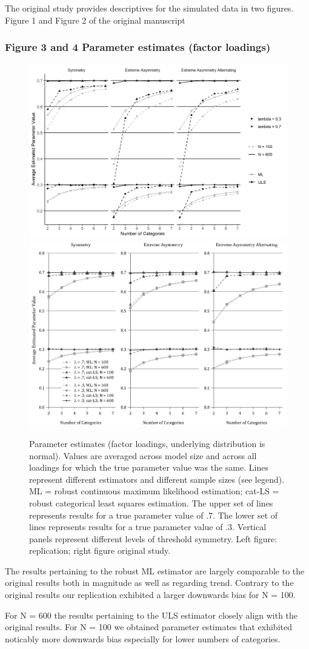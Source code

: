 \documentclass[10,a4paperpaper,]{article}
\begin{document}
The original study provides descriptives for the simulated data in two
figures. Figure 1 and Figure 2 of the original manuscript

\subsubsection{Figure 3 and 4 Parameter estimates (factor loadings)}

\begin{figure}
\includegraphics[width=0.49\linewidth]{./figures/fig_3} \includegraphics[width=0.49\linewidth]{./figures/fig3_original} \caption{Parameter estimates (factor loadings, underlying distribution is normal). Values are averaged across model size and across all loadings for which the true parameter value was the same. Lines represent different estimators and different sample sizes (see legend). ML = robust continuous maximum likelihood estimation; cat-LS = robust categorical least squares estimation. The upper set of lines represents results for a true parameter value of .7. The lower set of lines represents results for a true parameter value of .3. Vertical panels represent different levels of threshold symmetry. Left figure: replication; right figure original study.}\label{fig:fig3}
\end{figure}

The results pertaining to the robust ML estimator are largely comparable
to the original results both in magnitude as well as regarding trend.
Contrary to the original results our replication exhibited a larger
downwards bias for N = 100.

For N = 600 the results pertaining to the ULS estimator closely align
with the original results. For N = 100 we obtained parameter estimates
that exhibited noticably more downwards bias especially for lower
numbers of categories.
\end{document}
